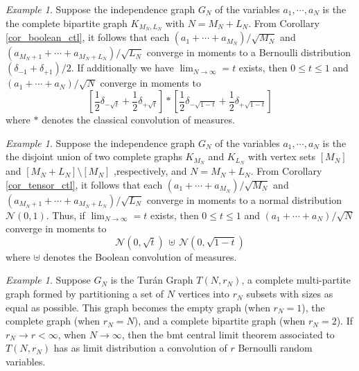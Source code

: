\documentclass[a4paper,12pt]{extarticle}
\theoremstyle{definition}
\theoremstyle{remark}
\newtheorem{exa}[thm]{Example}
\begin{document}
\begin{exa}
	Suppose the independence graph $G_N$ of the variables $a_1,\cdots,a_N$ is the the complete bipartite graph $K_{M_N,L_N}$ with $N = M_N + L_N$. 
	From Corollary \ref{cor_boolean_ctl}, it follows that each $(a_1 + \cdots + a_{M_N})/\sqrt{M_N}$ and $(a_{M_N+1} + \cdots + a_{M_N+L_N})/\sqrt{L_N}$ converge in moments to a Bernoulli distribution $(\delta_{-1} + \delta_{+1})/2$. 
	If additionally we have $\lim_{N\to \infty} = t$ exists, then $0 \leq t \leq 1$ and $(a_1+\cdots+a_N)/\sqrt{N}$ converge in moments to 
	\[
	\left[
	\frac{1}{2}		\delta_{-\sqrt{t}}
	+
	\frac{1}{2}		\delta_{+\sqrt{t}}
	\right]  \ast \left[
	\frac{1}{2}		\delta_{-\sqrt{1-t}}
	+
	\frac{1}{2}		\delta_{+\sqrt{1-t}}
	\right] 
	\]
	where $\ast$ denotes the classical convolution of measures. 
\end{exa}


\begin{exa}
	Suppose the independence graph $G_N$ of the variables $a_1,\cdots,a_N$ is the the disjoint union of two complete graphs $K_{M_N}$ and $K_{L_N}$ with vertex sets $[M_N]$ and $[M_N+L_N]\setminus[M_N]$ ,respectively, and $N = M_N + L_N$. 
	From Corollary \ref{cor_tensor_ctl}, it follows that each $(a_1 + \cdots + a_{M_N})/\sqrt{M_N}$ and $(a_{M_N+1} + \cdots + a_{M_N+L_N})/\sqrt{L_N}$ converge in moments to a normal distribution $\mathcal{N}(0,1)$. 
	Thus, if $\lim_{N\to \infty} = t$ exists, then $0 \leq t \leq 1$ and $(a_1+\cdots+a_N)/\sqrt{N}$ converge in moments to 
	\[
	\mathcal{N}(0,\sqrt{t})
	\, \uplus \,
	\mathcal{N}(0,\sqrt{1-t})
	\]
	where $\uplus$ denotes the Boolean convolution of measures. 
\end{exa}

\begin{exa}
	Suppose $G_N$ is the Turán Graph $T(N,r_N)$, a complete multi-partite graph formed by partitioning a set of $N$ vertices into $r_N$ subsets with sizes as equal as possible. 
	This graph becomes the empty graph (when $r_N=1$), the complete graph (when $r_N=N$), and a complete bipartite graph (when $r_N=2$). 
	If $r_N \to r <\infty$, when $N\to \infty$, then the bmt central limit theorem associated to $T(N,r_N)$ has as limit distribution a convolution of $r$ Bernoulli random variables. 
\end{exa}
\end{document}

